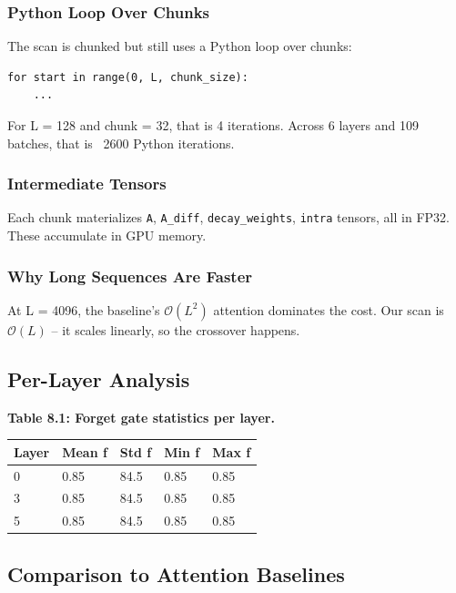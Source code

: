\subsubsection{Python Loop Over Chunks}

The scan is chunked but still uses a Python loop over chunks:

\begin{lstlisting}
for start in range(0, L, chunk_size):
    ...
\end{lstlisting}

For L = 128 and chunk = 32, that is 4 iterations. Across 6 layers and 109 
batches, that is ~2600 Python iterations.

\subsubsection{Intermediate Tensors}

Each chunk materializes \texttt{A}, \texttt{A\_diff}, \texttt{decay\_weights}, \texttt{intra} tensors, all 
in FP32. These accumulate in GPU memory.

\subsubsection{Why Long Sequences Are Faster}

At L = 4096, the baseline's $\mathcal{O}(L^2)$ attention dominates the cost. 
Our scan is $\mathcal{O}(L)$ -- it scales linearly, so the crossover happens.

\subsection{Per-Layer Analysis}

\textbf{Table 8.1: Forget gate statistics per layer.}

\begin{table}[H]
\centering
\small
\begin{tabular}{lllll}
\toprule
\textbf{Layer} & \textbf{Mean f} & \textbf{Std f} & \textbf{Min f} & \textbf{Max f} \\
\midrule
0 & 0.85 & 84.5 & 0.85 & 0.85 \\
3 & 0.85 & 84.5 & 0.85 & 0.85 \\
5 & 0.85 & 84.5 & 0.85 & 0.85 \\
\bottomrule
\end{tabular}
\end{table}

\subsection{Comparison to Attention Baselines}

